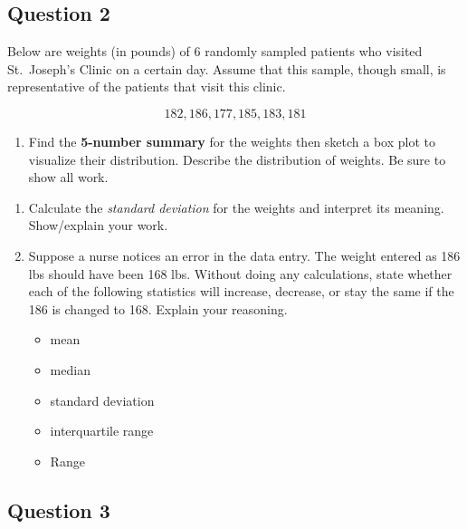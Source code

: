 \documentclass[
  letterpaper,
  DIV=11,
  numbers=noendperiod]{scrartcl}
\providecommand{\tightlist}{%
  \setlength{\itemsep}{0pt}\setlength{\parskip}{0pt}}\usepackage{longtable,booktabs,array}
\begin{document}
\subsection{Question 2}\label{question-2}

Below are weights (in pounds) of 6 randomly sampled patients who visited
St.~Joseph's Clinic on a certain day. Assume that this sample, though
small, is representative of the patients that visit this clinic.

\[182, 186, 177, 185, 183, 181\]

\begin{enumerate}
\def\labelenumi{\alph{enumi}.}
\tightlist
\item
  Find the \textbf{5-number summary} for the weights then sketch a box
  plot to visualize their distribution. Describe the distribution of
  weights. Be sure to show all work.
\end{enumerate}

\vspace{6cm}

\begin{enumerate}
\def\labelenumi{\alph{enumi}.}
\setcounter{enumi}{1}
\item
  Calculate the \emph{standard deviation} for the weights and interpret
  its meaning. Show/explain your work. \vspace{5cm}
\item
  Suppose a nurse notices an error in the data entry. The weight entered
  as 186 lbs should have been 168 lbs. Without doing any calculations,
  state whether each of the following statistics will increase,
  decrease, or stay the same if the 186 is changed to 168. Explain your
  reasoning.

  \begin{itemize}
  \tightlist
  \item
    mean \vspace{2cm}
  \item
    median \vspace{2cm}
  \item
    standard deviation \vspace{2cm}
  \item
    interquartile range \vspace{2cm}
  \item
    Range \vspace{2cm} \clearpage
  \end{itemize}
\end{enumerate}

\subsection{Question 3}\label{question-3}
\end{document}
